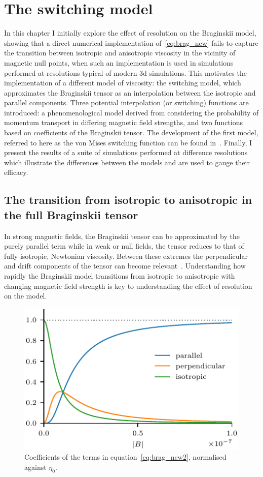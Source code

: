 \chapter{The switching model}
\label{chp:switching_model}

\graphicspath{{images/development_of_switching_model/}}

In this chapter I initially explore the effect of resolution on the Braginskii model, showing that a direct numerical implementation of~\ref{eq:brag_new} fails to capture the transition between isotropic and anisotropic viscosity in the vicinity of magnetic null points, when such an implementation is used in simulations performed at resolutions typical of modern 3d simulations. This motivates the implementation of a different model of viscosity: the switching model, which approximates the Braginskii tensor as an interpolation between the isotropic and parallel components. Three potential interpolation (or switching) functions are introduced: a phenomenological model derived from considering the probability of momentum transport in differing magnetic field strengths, and two functions based on coefficients of the Braginskii tensor. The development of the first model, referred to here as the von Mises switching function can be found in~\cite{mactaggartBraginskiiMagnetohydrodynamicsArbitrary2017}. Finally, I present the results of a suite of simulations performed at difference resolutions which illustrate the differences between the models and are used to gauge their efficacy.

\section{The transition from isotropic to anisotropic in the full Braginskii tensor}

In strong magnetic fields, the Braginskii tensor can be approximated by the purely parallel term while in weak or null fields, the tensor reduces to that of fully isotropic, Newtonian viscosity. Between these extremes the perpendicular and drift components of the tensor can become relevant~\cite{erdelyiResonantAbsorptionAlfven1995a}. Understanding how rapidly the Braginskii model transitions from isotropic to anisotropic with changing magnetic field strength is key to understanding the effect of resolution on the model.

\begin{figure}[t]
  \centering
  \includegraphics[width=0.5\linewidth]{brag_coeffs_2.pdf}
  \caption{Coefficients of the terms in equation~\ref{eq:brag_new2}, normalised against $\eta_0$.}%
  \label{fig:brag_coeffs2}
\end{figure}

